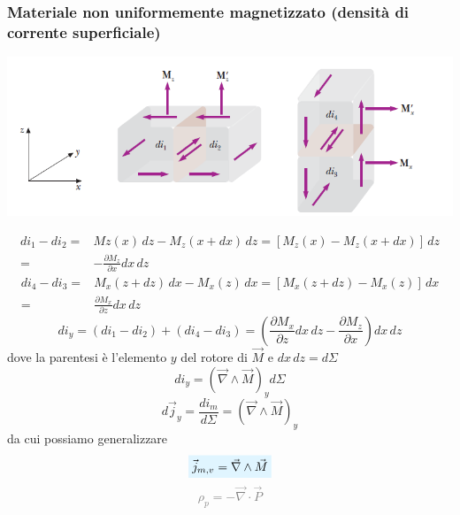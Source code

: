 \documentclass[x11names]{report}
\begin{document}
\subsubsection{Materiale non uniformemente magnetizzato (densità di corrente superficiale)}
\begin{center}
	\includegraphics[scale=0.5]{img/materia_4.png}
\end{center}
\begin{align*}
	di_1 - di_2 =& Mz(x)\, dz - M_z(x+dx)\, dz = \left[M_z(x) - M_z(x+dx)\right]\, dz \\
	 =& -\frac{\partial M_z}{\partial x} dx \, dz
\end{align*}
\begin{align*}
	di_4 - di_3 =& M_x(z+dz)\, dx - M_x(z)\, dx  = \left[M_x(z+dz) - M_x(z)\right]\, dx \\
	=& \frac{\partial M_x}{\partial z} dx \, dz
\end{align*}
\[
di_y = (di_1 - di_2) + (di_4 - di_3) = \left(\frac{\partial M_x}{\partial z} dx \, dz -\frac{\partial M_z}{\partial x}\right) dx \, dz 
\]
dove la parentesi è l'elemento \(y\) del rotore di \(\vec{M}\) e \(dx \, dz = d\Sigma\)
\[
di_y = \left(\vec{\nabla} \wedge \vec{M} \right)_y d\Sigma
\]
\[
d\vec{j}_y = \frac{di_m}{d\Sigma} =  \left(\vec{\nabla} \wedge \vec{M} \right)_y 
\]
da cui possiamo generalizzare 
\begin{equation}
	\viola{\vec{j}_{m,v} =  \vec{\nabla} \wedge \vec{M} }
\end{equation}
\vspace{-0.3cm}
\textcolor{gray}{\[
	\rho_p = - \vec{\nabla}\cdot \vec{P}
	\]}
\end{document}
